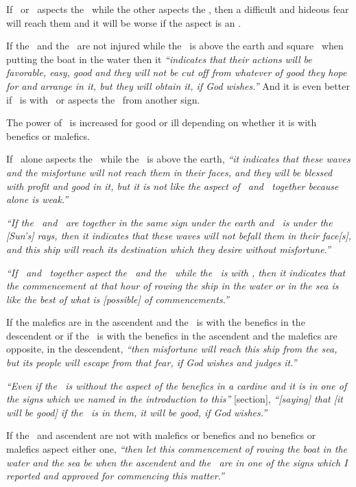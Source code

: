 If \Mars\, or \Saturn\, aspects the \Sun\, while the other aspects the \Moon, then a difficult and hideous fear will reach them and it will be worse if the aspect is an \Opposition.

If the \Sun\, and the \Moon\, are not injured while the \Moon\, is above the earth and square \Jupiter\, when putting the boat in the water then it \textsl{``indicates that their actions will be favorable, easy, good and they will not be cut off from whatever of good they hope for and arrange in it, but they will obtain it, if God wishes.''} And it is even better if \Venus\, is with \Jupiter\, or aspects the \Moon\, from another sign.

The power of \Mercury\, is increased for good or ill depending on whether it is with benefics or malefics.

If \Venus\, alone aspects the \Moon\, while the \Moon\, is above the earth, \textsl{``it indicates that these waves and the misfortune will not reach them in their faces, and they will be blessed with profit and good in it, but it is not like the aspect of \Jupiter\, and \Venus\, together because \Venus\, alone is weak.''}

\textsl{``If the \Moon\, and \Venus\, are together in the same sign under the earth and \Venus\, is under the [Sun's] rays, then it indicates that these waves will not befall them in their face[s], and this ship will reach its destination which they desire without misfortune.''}

\textsl{``If \Jupiter\, and \Venus\, together aspect the \Sun\, and the \Moon\, while the \Moon\, is with \Mercury, then it indicates that the commencement at that hour of rowing the ship in the water or in the sea is like the best of what is [possible] of commencements.''}

If the malefics are in the ascendent and the \Moon\, is with the benefics in the descendent or if the \Moon\, is with the benefics in the ascendent and the malefics are opposite, in the descendent, \textsl{``then misfortune will reach this ship from the sea, but its people will escape from that fear, if God wishes and judges it.''}

\textsl{``Even if the \Moon\, is without the aspect of the benefics in a cardine and it is in one of the signs which we named in the introduction to this''} [section], \textsl{``[saying] that [it will be good] if the \Moon\, is in them, it will be good, if God wishes.''}

If the \Moon\, and ascendent are not with malefics or benefics and no benefics or malefics aspect either one, \textsl{``then let this commencement of rowing the boat in the water and the sea be when the ascendent and the \Moon\, are in one of the signs which I reported and approved for commencing this matter.''}

